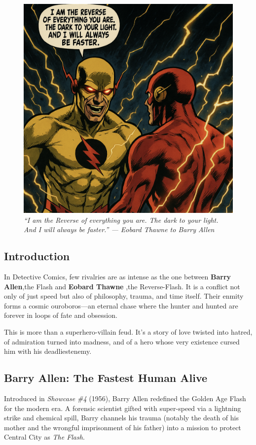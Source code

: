 \documentclass[a4paper,10pt,twocolumn]{memoir}
\begin{document}
\begin{figure}[h!]
  \centering
  \includegraphics[width=0.9\linewidth]{reverse_.png}
  \caption*{\textit{“I am the Reverse of everything you are. The dark to your light. And I will always be faster.” — Eobard Thawne to Barry Allen}}
\end{figure}

\subsection*{Introduction}
In Detective Comics, few rivalries are as intense as the one between \textbf{Barry Allen},the Flash and \textbf{Eobard Thawne },the Reverse-Flash. It is a conflict not only of just speed but also of philosophy, trauma, and time itself. Their enmity forms a cosmic ouroboros—an eternal chase where the hunter and hunted are forever in loops of fate and obsession.

This is more than a superhero-villain feud. It’s a story of love twisted into hatred, of admiration turned into madness, and of a hero whose very existence cursed him with his deadliestenemy.


\subsection*{Barry Allen: The Fastest Human Alive}
Introduced in \textit{Showcase \#4} (1956), Barry Allen redefined the Golden Age Flash for the modern era. A forensic scientist gifted with super-speed via a lightning strike and chemical spill, Barry channels his trauma (notably the death of his mother and the wrongful imprisonment of his father) into a mission to protect Central City as \textit{The Flash}.
\end{document}
